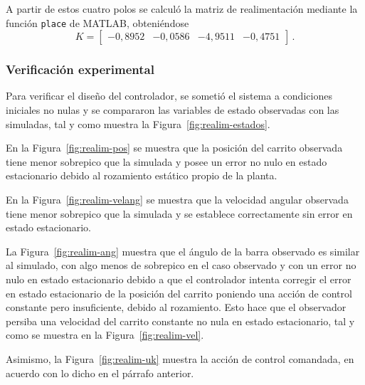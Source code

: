 A partir de estos cuatro polos se calculó la matriz de realimentación mediante la función \texttt{place} de MATLAB, obteniéndose
\[
K = \begin{bmatrix} -0,8952 & -0,0586 & -4,9511 & -0,4751 \end{bmatrix}\,.
\]

\subsubsection{Verificación experimental}

Para verificar el diseño del controlador, se sometió el sistema a condiciones iniciales no nulas y se compararon las variables de estado observadas con las simuladas, tal y como muestra la Figura~\ref{fig:realim-estados}. 

En la Figura~\ref{fig:realim-pos} se muestra que la posición del carrito observada tiene menor sobrepico que la simulada y posee un error no
nulo en estado estacionario debido al rozamiento estático propio de la planta.

En la Figura~\ref{fig:realim-velang} se muestra que la velocidad angular observada tiene menor sobrepico que la simulada y se establece correctamente sin error en estado estacionario.

La Figura~\ref{fig:realim-ang} muestra que el ángulo de la barra observado es similar al simulado, con algo menos de sobrepico en el caso observado y con un error no nulo en estado estacionario debido a que el controlador intenta corregir el error en estado estacionario de la posición del carrito poniendo una acción de control constante pero insuficiente, debido al rozamiento. Esto hace que el observador persiba una velocidad del carrito constante no nula en estado estacionario, tal y como se muestra en la Figura~\ref{fig:realim-vel}.

Asimismo, la Figura~\ref{fig:realim-uk} muestra la acción de control comandada, en acuerdo con lo dicho en el párrafo anterior.

